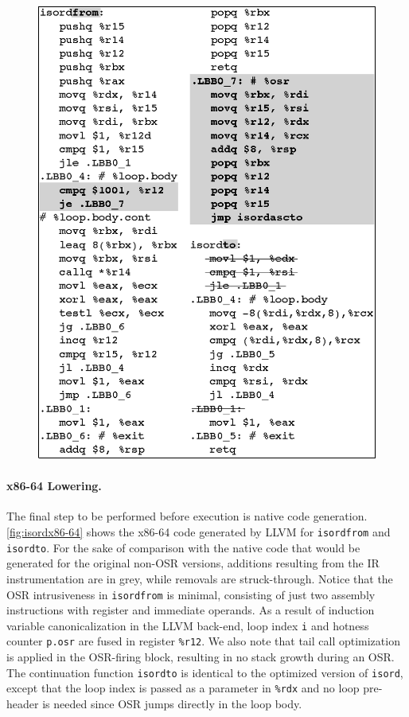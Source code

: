 \ifdefined\noauthorea
\begin{figure}[t]
\begin{center}
\includegraphics[width=0.9\columnwidth]{figures/isordx86-64/isordx86-64.eps}
\caption{\protect}
\end{center}
\end{figure}
\fi

\paragraph{x86-64 Lowering.}
The final step to be performed before execution is native code generation. \myfigure\ref{fig:isordx86-64} shows the x86-64 code generated by LLVM for {\tt isordfrom} and {\tt isordto}. For the sake of comparison with the native code that would be generated for the original non-OSR versions, additions resulting from the IR instrumentation are in grey, while removals are struck-through. Notice that the OSR intrusiveness in {\tt isordfrom} is minimal, consisting of just two assembly instructions with register and immediate operands. As a result of induction variable canonicalization in the LLVM back-end, loop index {\tt i} and hotness counter {\tt p.osr} are fused in register {\tt\%r12}. We also note that tail call optimization is applied in the OSR-firing block, resulting in no stack growth during an OSR. The continuation function {\tt isordto} is identical to the optimized version of {\tt isord}, except that the loop index is passed as a parameter in {\tt \%rdx} and no loop pre-header is needed since OSR jumps directly in the loop body.

